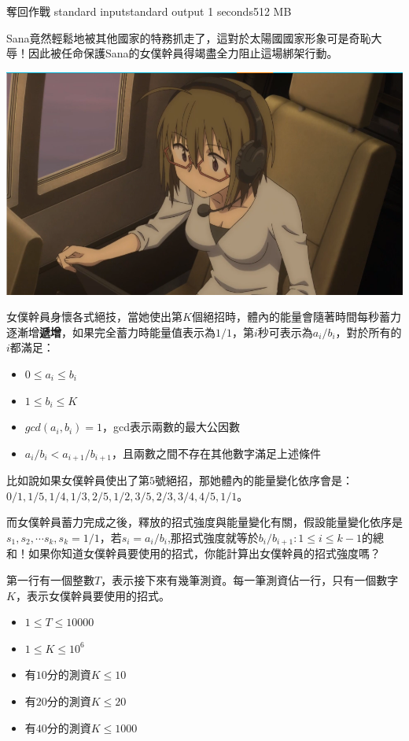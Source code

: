 \gdef\thisproblemauthor{}
\gdef\thisproblemdeveloper{}
\gdef\thisproblemorigin{}
\begin{problem}{奪回作戰}
{standard input}{standard output}
{1 seconds}{512 MB}{}

Sana竟然輕鬆地被其他國家的特務抓走了，這對於太陽國國家形象可是奇恥大辱！因此被任命保護Sana的女僕幹員得竭盡全力阻止這場綁架行動。

\centerline{\includegraphics[scale=0.3]{./pics/E.png}}

女僕幹員身懷各式絕技，當她使出第$K$個絕招時，體內的能量會隨著時間每秒蓄力逐漸增\textbf{遞增}，如果完全蓄力時能量值表示為$1/1$，第$i$秒可表示為$a_i/b_i$，對於所有的$i$都滿足：
\begin{itemize}
\item $0\leq a_i \leq b_i$
\item $1\leq b_i \leq K$
\item $gcd(a_i,b_i)=1$，gcd表示兩數的最大公因數
\item $a_i/b_i < a_{i+1}/b_{i+1}$，且兩數之間不存在其他數字滿足上述條件
\end{itemize}

比如說如果女僕幹員使出了第$5$號絕招，那她體內的能量變化依序會是：$0/1, 1/5, 1/4, 1/3, 2/5, 1/2, 3/5, 2/3, 3/4, 4/5, 1/1$。

而女僕幹員蓄力完成之後，釋放的招式強度與能量變化有關，假設能量變化依序是$s_1,s_2,\cdots s_k,s_k=1/1$，若$s_i=a_i/b_i$,那招式強度就等於$b_i/b_{i+1}:1\leq i\leq k-1$的總和！如果你知道女僕幹員要使用的招式，你能計算出女僕幹員的招式強度嗎？

\InputFile

第一行有一個整數$T$，表示接下來有幾筆測資。每一筆測資佔一行，只有一個數字$K$，表示女僕幹員要使用的招式。

\begin{iofmt}
\begin{itemize}
	\item $1\leq T \leq 10000$
	\item $1\leq K \leq 10^6$
	\item 有$10$分的測資$K\leq 10$
	\item 有$20$分的測資$K\leq 20$
	\item 有$40$分的測資$K\leq 1000$
\end{itemize}
\end{iofmt}


\end{problem}
